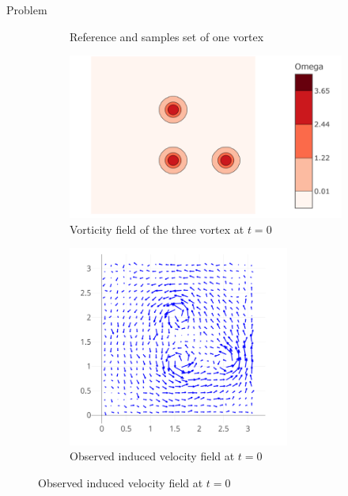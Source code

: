 \documentclass[aspectratio=169]{beamer} %
\begin{document}
\begin{frame}{Problem}
\begin{figure}
\begin{subfigure}[t]{0.32\textwidth}
            \caption*{\tiny Reference and samples set of one vortex}
        \end{subfigure}
        \begin{subfigure}[t]{0.32\textwidth}
            \centering
            \includegraphics[width=\textwidth]{images/vorticity_field.png}
            \caption*{\tiny Vorticity field of the three vortex at $t=0$}
        \end{subfigure}
        \begin{subfigure}[t]{0.32\textwidth}
            \centering
            \includegraphics[width=0.8\textwidth]{images/obs_velocity.png}
            \caption*{\tiny Observed induced velocity field at $t=0$}
        \end{subfigure}
    \end{figure}

\end{frame}
\end{document}
